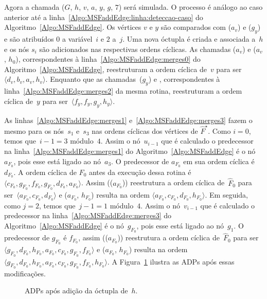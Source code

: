 Agora a chamada \MSFaddEdge($G$, $h$, $v$, $a$, $y$, $g$, $7$) será simulada.
O processo é análogo ao caso anterior até a linha~\ref{Algo:MSFaddEdge:linha:deteccao-caso} do Algoritmo~\ref{Algo:MSFaddEdge}.
Os vértices $v$ e $y$ são comparados com \LCOFindNode($a_v$) e \LCOFindNode($g_y$) e são atribuídos $0$ a variável~$i$ e $2$ a~$j$.
Uma nova óctupla é criada e associada a~$h$ e os nós $s_i$ são adicionados nas respectivas ordens cíclicas.
As chamadas \LCOCycle($a_v$) e \LCOMerge($a_v$, $h_0$), correspondentes à linha~\ref{Algo:MSFaddEdge:merges0} do Algoritmo~\ref{Algo:MSFaddEdge}, reestruturam a ordem cíclica de~$v$ para ser $\langle d_v, b_v, a_v, h_v \rangle$.
Enquanto que as chamadas~\LCOCycle($g_y$) e , correspondentes à linha~\ref{Algo:MSFaddEdge:merges2} da mesma rotina, reestruturam a ordem cíclica de~$y$ para ser~$\langle f_y, f_y, g_y, h_y \rangle$.


As linhas~\ref{Algo:MSFaddEdge:merges1} e~\ref{Algo:MSFaddEdge:merges3} fazem o mesmo para os nós~$s_1$ e~$s_3$ nas ordens cíclicas dos vértices de $\hat F^\star$.
Como $i=0$, temos que~$i-1 = 3$ módulo~$4$.
Assim o nó~$u_{i-1}$ que é calculado o predecessor na linha~\ref{Algo:MSFaddEdge:merges1} do Algoritmo~\ref{Algo:MSFaddEdge} é o nó~$a_{F_0}$, pois esse está ligado ao nó~$a_3$.
O predecessor de $a_{F_0}$ em sua ordem cíclica é $d_{F_0}$.
A ordem cíclica de $F_0$ antes da execução dessa rotina é $\langle c_{F_0}, g_{F_0}, f_{F_0}, g_{F_0}, d_{F_0}, a_{F_0} \rangle$.
Assim \LCOCycle(\treapPredecessor($a_{F_0}$)) reestrutura a ordem cíclica de~$\hat F_0$ para ser~$\langle a_{F_0}, c_{F_0}, d_{F_0}\rangle$ e \LCOMerge($a_{F_0}$, $h_{F_0}$) resulta na ordem $\langle a_{F_0}, c_{F_0}, d_{F_0}, h_{F_0}\rangle$.
Em seguida, como $j=2$, temos que~$j-1 = 1$ módulo~$4$.
Assim o nó~$v_{i-1}$ que é calculado o predecessor na linha~\ref{Algo:MSFaddEdge:merges3} do Algoritmo~\ref{Algo:MSFaddEdge} é o nó~$g_{F_0}$, pois esse está ligado ao nó~$g_1$.
O predecessor de $g_{F_0}$ é $f_{F_0}$, assim \LCOCycle(\treapPredecessor($a_{F_0}$)) reestrutura a ordem cíclica de~$\hat F_0$ para ser~$\langle g_{F_0}, d_{F_0}, h_{F_0}, a_{F_0}, c_{F_0}, g_{F_0}, f_{F_0}\rangle$ e \LCOMerge($a_{F_0}$, $h_{F_0}$) resulta na ordem~$\langle g_{F_0}, d_{F_0}, h_{F_0}, a_{F_0}, c_{F_0}, g_{F_0}, f_{F_0}, h_{F_0}\rangle$.
A Figura~\ref{fig:MSF-adiciona-nao-ponte-1} ilustra as ADPs após essas modificações.

\begin{figure}[htb]
\scalebox{1}{

}
\caption{ADPs após adição da óctupla de~$h$.}
\label{fig:MSF-adiciona-nao-ponte-1}
\end{figure}

